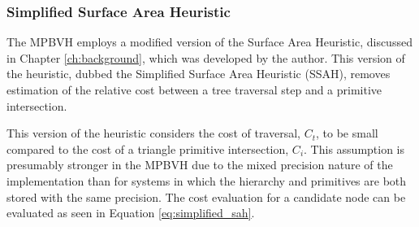 \subsubsection{Simplified Surface Area Heuristic}\label{sec:ssah}

The MPBVH employs a modified version of the Surface Area Heuristic,
discussed in Chapter \ref{ch:background}, which was developed by the
author. This version of the heuristic, dubbed the Simplified Surface Area
Heuristic (SSAH), removes estimation of the relative cost between a tree
traversal step and a primitive intersection.

This version of the heuristic considers the cost of traversal, $C_{t}$, to be
small compared to the cost of a triangle primitive intersection, $C_{i}$. This
assumption is presumably stronger in the MPBVH due to the mixed precision nature
of the implementation than for systems in which the hierarchy and primitives are
both stored with the same precision. The cost evaluation for a candidate node
can be evaluated as seen in Equation \eqref{eq:simplified_sah}.

